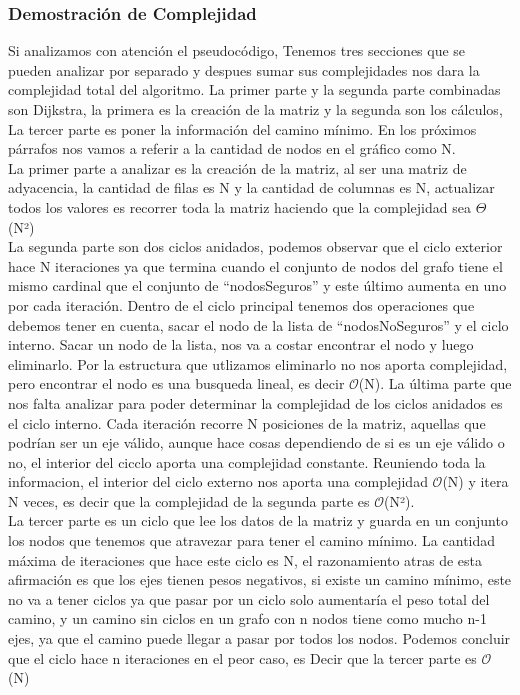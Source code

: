 \documentclass[spanish,12pt]{article}
\begin{document}
\subsubsection{Demostración de Complejidad}

Si analizamos con atención el pseudocódigo, Tenemos tres secciones que se pueden analizar por separado y despues sumar sus complejidades nos dara la complejidad total del algoritmo. La primer parte y la segunda parte combinadas son Dijkstra, la primera es la creación de la matriz y la segunda son los cálculos, La tercer parte es poner la información del camino mínimo. En los próximos párrafos nos vamos a referir a la cantidad de nodos en el gráfico como N. 
\\
	 La primer parte a analizar es la creación de la matriz, al ser una matriz de adyacencia, la cantidad de filas es N y la cantidad de columnas es N, actualizar todos los valores es recorrer toda la matriz haciendo que la complejidad sea $\Theta$(N²)
\\
	La segunda parte son dos ciclos anidados, podemos observar que el ciclo exterior hace N iteraciones ya que termina cuando el conjunto de nodos del grafo tiene el mismo cardinal que el conjunto de ``nodosSeguros'' y este último aumenta en uno por cada iteración. Dentro de el ciclo principal tenemos dos operaciones que debemos tener en cuenta, sacar el nodo de la lista de ``nodosNoSeguros'' y el ciclo interno. Sacar un nodo de la lista, nos va a costar encontrar el nodo y luego eliminarlo. Por la estructura que utlizamos eliminarlo no nos aporta complejidad, pero encontrar el nodo es una busqueda lineal, es decir $\mathcal{O}$(N). La última parte que nos falta analizar para poder determinar la complejidad de los ciclos anidados es el ciclo interno. Cada iteración recorre N posiciones de la matriz, aquellas que podrían ser un eje válido, aunque hace cosas dependiendo de si es un eje válido o no, el interior del cicclo aporta una complejidad constante. Reuniendo toda la informacion, el interior del ciclo externo nos aporta una complejidad $\mathcal{O}$(N) y itera N veces, es decir que la complejidad de la segunda parte es $\mathcal{O}$(N²).
\\
	 La tercer parte es un ciclo que lee los datos de la matriz y guarda en un conjunto los nodos que tenemos que atravezar para tener el camino mínimo. La cantidad máxima de iteraciones que hace este ciclo es N, el razonamiento atras de esta afirmación es que los ejes tienen pesos negativos, si existe un camino mínimo, este no va a tener ciclos ya que pasar por un ciclo solo aumentaría el peso total del camino, y un camino sin ciclos en un grafo con n nodos tiene como mucho n-1 ejes, ya que el camino puede llegar a pasar por todos los nodos. Podemos concluir que el ciclo hace n iteraciones en el peor caso, es Decir que la tercer parte es $\mathcal{O}$(N)
\end{document}
